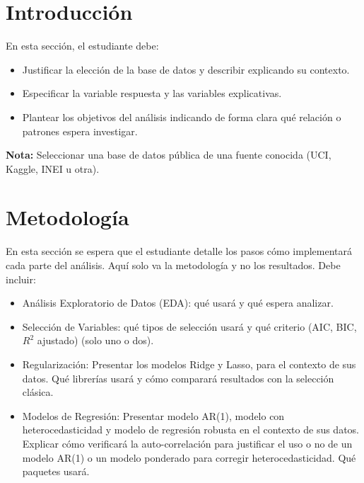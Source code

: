 \documentclass[12pt]{article}
\begin{document}
\newpage

\tableofcontents

\newpage

\section{Introducción}
En esta sección, el estudiante debe:  
\begin{itemize}
    \item Justificar la elección de la base de datos y describir explicando su contexto. 
    \item Especificar la variable respuesta y las variables explicativas.  
    \item Plantear los objetivos del análisis indicando de forma clara qué relación o patrones espera investigar.
\end{itemize}

\noindent \textbf{Nota:} Seleccionar una base de datos pública de una fuente conocida (UCI, Kaggle, INEI u otra).  


\section{Metodología}
En esta sección se espera que el estudiante detalle los pasos cómo implementará cada parte del análisis. Aquí solo va la metodología y no los resultados. Debe incluir:
\begin{itemize}
    \item Análisis Exploratorio de Datos (EDA): qué usará y qué espera analizar.
    \item Selección de Variables: qué tipos de selección usará y qué criterio (AIC, BIC, $R^2$ ajustado) (solo uno o dos).  
    \item Regularización: Presentar los modelos Ridge y Lasso, para el contexto de sus datos. Qué librerías usará y cómo comparará resultados con la selección clásica.  
    \item Modelos de Regresión: Presentar modelo AR(1), modelo con heterocedasticidad y modelo de regresión robusta en el contexto de sus datos. Explicar cómo verificará la auto-correlación para justificar el uso o no de un modelo AR(1) o un modelo ponderado para corregir heterocedasticidad. Qué paquetes usará.
\end{itemize}

\end{document}
